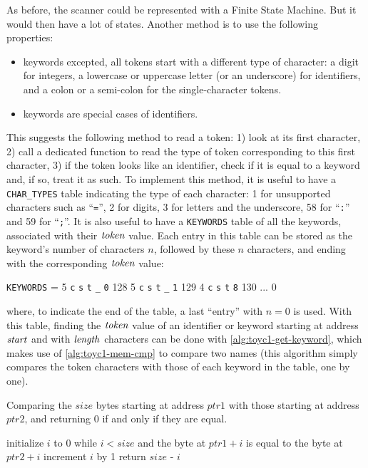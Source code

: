 As before, the scanner could be represented with a Finite State Machine. But it
would then have a lot of states. Another method is to use the following
properties:
\begin{itemize}
\item keywords excepted, all tokens start with a different type of character: a
digit for integers, a lowercase or uppercase letter (or an underscore) for
identifiers, and a colon or a semi-colon for the single-character tokens.

\item keywords are special cases of identifiers.
\end{itemize}

This suggests the following method to read a token: 1) look at its first
character, 2) call a dedicated function to read the type of token corresponding
to this first character, 3) if the token looks like an identifier, check if it
is equal to a keyword and, if so, treat it as such. To implement this method,
it is useful to have a {\tt CHAR\_TYPES}  table indicating the type of each
character: 1 for unsupported characters such as ``{\tt =}'', 2 for digits, 3
for letters and the underscore, 58 for ``{\tt :}'' and 59 for ``{\tt ;}''. It
is also useful to have a {\tt KEYWORDS} table of all the keywords, associated
with their $\it{token}$ value. Each entry in this table can be stored as the
keyword's number of characters $n$, followed by these $n$ characters, and
ending with the corresponding $\it{token}$ value:

{\tt KEYWORDS} = 5 {\tt c} {\tt s} {\tt t} {\tt \_} {\tt 0} 128\hspace{1em}
  5 {\tt c} {\tt s} {\tt t} {\tt \_} {\tt 1} 129\hspace{1em}
  4 {\tt c} {\tt s} {\tt t} {\tt 8} 130\hspace{1em}
  ...\hspace{1em}
  0

\noindent where, to indicate the end of the table, a last ``entry'' with $n=0$
is used. With this table, finding the $\it{token}$ value of an identifier or
keyword starting at address $\it{start}$ and with $\it{length}$ characters can
be done with \cref{alg:toyc1-get-keyword}, which makes use of
\cref{alg:toyc1-mem-cmp} to compare two names (this algorithm simply compares
the token characters with those of each keyword in the table, one by one).

\begin{Algorithm}
\caption{Comparing the $size$ bytes starting at address $ptr1$ with those
starting at address $ptr2$, and returning 0 if and only if they are
equal.}\label{alg:toyc1-mem-cmp}
\begin{algorithmic}[1]
\State initialize $i$ to 0
\Begin while $i<size$ and the byte at $ptr1+i$ is equal to the byte at $ptr2+i$
  \State increment $i$ by 1
\End
\State return $size$ - $i$
\end{algorithmic}
\end{Algorithm}

